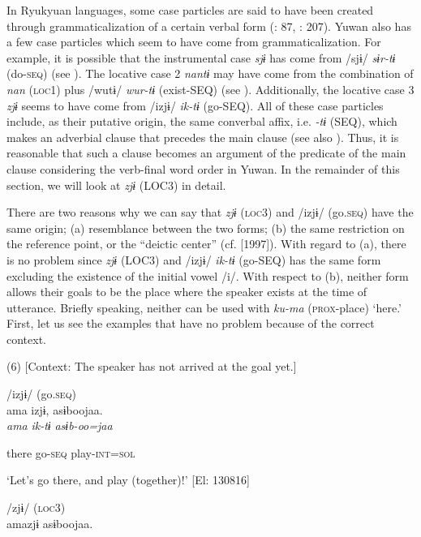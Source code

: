 In Ryukyuan languages, some case particles are said to have been created through grammaticalization of a certain verbal form (\citealt{NishiokaNakahara2000}: 87, \citealt{Shimoji2008}: 207). Yuwan also has a few case particles which seem to have come from grammaticalization. For example, it is possible that the instrumental case \textit{sjɨ} has come from /sjɨ/ \textit{sɨr-tɨ} (do-\textsc{seq}) (see ). The locative case 2 \textit{nantɨ} may have come from the combination of \textit{nan} (\textsc{loc}1) plus /wutɨ/ \textit{wur-tɨ} (exist-SEQ) (see ). Additionally, the locative case 3 \textit{zjɨ} seems to have come from /izjɨ/ \textit{ik-tɨ} (go-SEQ). All of these case particles include, as their putative origin, the same converbal affix, i.e. \textit{{}-tɨ} (SEQ), which makes an adverbial clause that precedes the main clause (see also ). Thus, it is reasonable that such a clause becomes an argument of the predicate of the main clause considering the verb-final word order in Yuwan. In the remainder of this section, we will look at \textit{zjɨ} (LOC3) in detail.

There are two reasons why we can say that \textit{zjɨ} (\textsc{loc}3) and /izjɨ/ (go.\textsc{seq}) have the same origin; (a) resemblance between the two forms; (b) the same restriction on the reference point, or the “deictic center” (cf. \citealt{Fillmore1971} [1997]). With regard to (a), there is no problem since \textit{zjɨ} (LOC3) and /izjɨ/ \textit{ik-tɨ} (go-SEQ) has the same form excluding the existence of the initial vowel /i/. With respect to (b), neither form allows their goals to be the place where the speaker exists at the time of utterance. Briefly speaking, neither can be used with \textit{ku-ma} (\textsc{prox}-place) ‘here.’ First, let us see the examples that have no problem because of the correct context.

(6)  [Context: The speaker has not arrived at the goal yet.]

 \ea /izjɨ/ (go.\textsc{seq})\\
{\TM}
\gll  ama  izjɨ,  asɨboojaa.\\

      \textit{ama}  \textit{ik-tɨ}  \textit{asɨb-oo=jaa}

      there  go-\textsc{seq}  play-\textsc{int}=\textsc{sol}

\glt ‘Let’s go there, and play (together)!’ [El: 130816]

 \ex /zjɨ/ (\textsc{loc}3)\\
{\TM}
\gll  amazjɨ  asɨboojaa.\\


